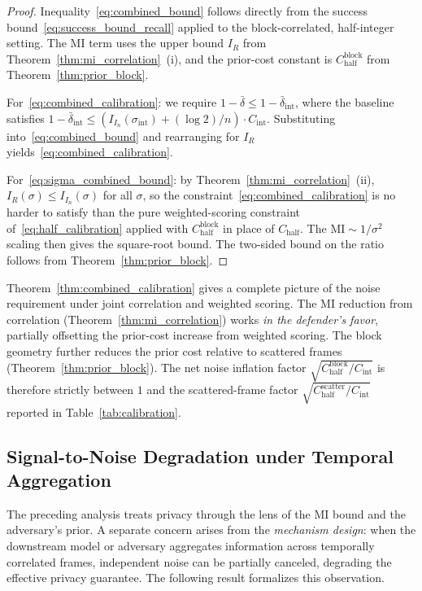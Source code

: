 \documentclass[letterpaper]{article} %
\begin{document}
\begin{proof}
Inequality~\eqref{eq:combined_bound} follows directly from the
success bound~\eqref{eq:success_bound_recall} applied to the
block-correlated, half-integer setting.  The MI term uses the
upper bound $I_R$ from Theorem~\ref{thm:mi_correlation}~(i),
and the prior-cost constant is $C^{\mathrm{block}}_{\mathrm{half}}$
from Theorem~\ref{thm:prior_block}.

For~\eqref{eq:combined_calibration}: we require
$1 - \bar\delta \le 1 - \bar\delta_{\mathrm{int}}$, where the
baseline satisfies
$1 - \bar\delta_{\mathrm{int}} \le
(I_{I_n}(\sigma_{\mathrm{int}}) + (\log 2)/n) \cdot C_{\mathrm{int}}$.
Substituting into~\eqref{eq:combined_bound} and rearranging for
$I_R$ yields~\eqref{eq:combined_calibration}.

For~\eqref{eq:sigma_combined_bound}: by
Theorem~\ref{thm:mi_correlation}~(ii),
$I_R(\sigma) \le I_{I_n}(\sigma)$ for all $\sigma$, so the
constraint~\eqref{eq:combined_calibration} is no harder to
satisfy than the pure weighted-scoring constraint
of~\eqref{eq:half_calibration} applied with $C^{\mathrm{block}}_{\mathrm{half}}$
in place of $C_{\mathrm{half}}$.  The $\mathrm{MI} \sim 1/\sigma^2$
scaling then gives the square-root bound.  The two-sided bound
on the ratio follows from Theorem~\ref{thm:prior_block}.
\end{proof}

Theorem~\ref{thm:combined_calibration} gives a complete picture
of the noise requirement under joint correlation and weighted
scoring.  The MI reduction from correlation
(Theorem~\ref{thm:mi_correlation}) works \emph{in the defender's
favor}, partially offsetting the prior-cost increase from weighted
scoring.  The block geometry further reduces the prior cost
relative to scattered frames
(Theorem~\ref{thm:prior_block}).  The net noise inflation
factor $\sqrt{C^{\mathrm{block}}_{\mathrm{half}}/C_{\mathrm{int}}}$
is therefore strictly between $1$ and the scattered-frame factor
$\sqrt{C^{\mathrm{scatter}}_{\mathrm{half}}/C_{\mathrm{int}}}$
reported in Table~\ref{tab:calibration}.

\subsection{Signal-to-Noise Degradation under Temporal Aggregation}

The preceding analysis treats privacy through the lens of the
MI bound and the adversary's prior.  A separate concern arises
from the \emph{mechanism design}: when the downstream model or
adversary aggregates information across temporally correlated
frames, independent noise can be partially canceled, degrading
the effective privacy guarantee.  The following result
formalizes this observation.
\end{document}
